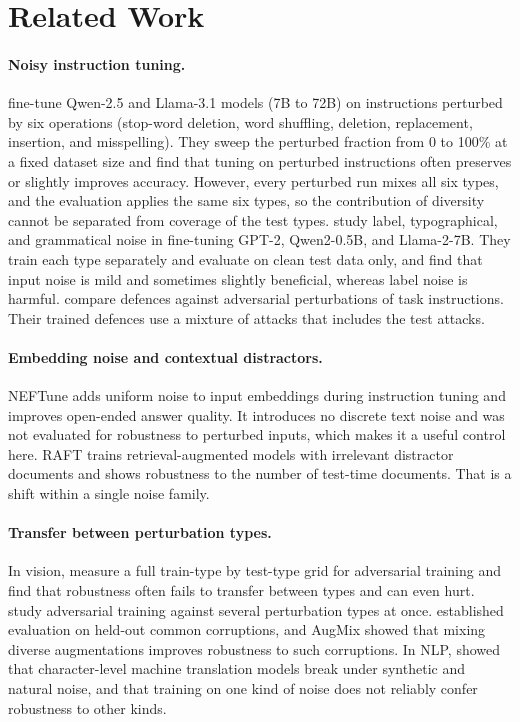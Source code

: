 \documentclass[11pt]{article}
\begin{document}
\section{Related Work}
\label{sec:related}

\paragraph{Noisy instruction tuning.} \citet{alajrami2025noisy} fine-tune Qwen-2.5 and Llama-3.1 models (7B to 72B) on instructions perturbed by six operations (stop-word deletion, word shuffling, deletion, replacement, insertion, and misspelling). They sweep the perturbed fraction from 0 to 100\% at a fixed dataset size and find that tuning on perturbed instructions often preserves or slightly improves accuracy. However, every perturbed run mixes all six types, and the evaluation applies the same six types, so the contribution of diversity cannot be separated from coverage of the test types. \citet{li2026analyzing} study label, typographical, and grammatical noise in fine-tuning GPT-2, Qwen2-0.5B, and Llama-2-7B. They train each type separately and evaluate on clean test data only, and find that input noise is mild and sometimes slightly beneficial, whereas label noise is harmful. \citet{agrawal2025enhancing} compare defences against adversarial perturbations of task instructions. Their trained defences use a mixture of attacks that includes the test attacks.

\paragraph{Embedding noise and contextual distractors.} NEFTune \citep{jain2024neftune} adds uniform noise to input embeddings during instruction tuning and improves open-ended answer quality. It introduces no discrete text noise and was not evaluated for robustness to perturbed inputs, which makes it a useful control here. RAFT \citep{zhang2024raft} trains retrieval-augmented models with irrelevant distractor documents and shows robustness to the number of test-time documents. That is a shift within a single noise family.

\paragraph{Transfer between perturbation types.} In vision, \citet{kang2019transfer} measure a full train-type by test-type grid for adversarial training and find that robustness often fails to transfer between types and can even hurt. \citet{tramer2019adversarial} study adversarial training against several perturbation types at once. \citet{hendrycks2019benchmarking} established evaluation on held-out common corruptions, and AugMix \citep{hendrycks2020augmix} showed that mixing diverse augmentations improves robustness to such corruptions. In NLP, \citet{belinkov2018synthetic} showed that character-level machine translation models break under synthetic and natural noise, and that training on one kind of noise does not reliably confer robustness to other kinds.
\end{document}
